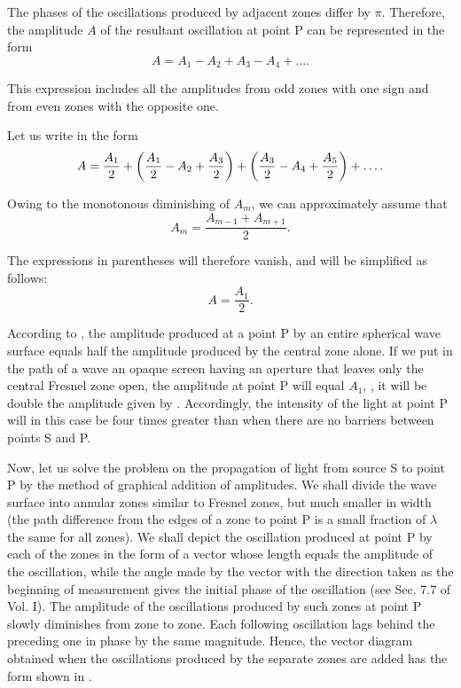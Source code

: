 The phases of the oscillations produced by adjacent zones differ by $\pi$.
Therefore, the amplitude $A$ of the resultant oscillation at point P can be represented in the form
\begin{equation}\label{eq:18_9}
    A = A_1 - A_2 + A_3 - A_4 + \ldots .
\end{equation}

This expression includes all the amplitudes from odd zones with one sign and from even zones with the opposite one.

Let us write  in the form
\begin{equation}\label{eq:18_10}
	A = \frac{A_1}{2} + \left( \frac{A_1}{2} - A_2 + \frac{A_3}{2} \right) + \left( \frac{A_3}{2} - A_4 + \frac{A_5}{2} \right) + \ldots .
\end{equation}

\noindent
Owing to the monotonous diminishing of $A_m$, we can approximately assume that
\begin{equation*}
	A_m = \frac{A_{m-1} + A_{m+1}}{2}.
\end{equation*}

\noindent
The expressions in parentheses will therefore vanish, and  will be simplified as follows:
\begin{equation}\label{eq:18_11}
	A = \frac{A_1}{2}.
\end{equation}

\noindent
According to , the amplitude produced at a point P by an entire spherical wave surface equals half the amplitude produced by the central zone alone.
If we put in the path of a wave an opaque screen having an aperture that leaves only the central Fresnel zone open, the amplitude at point P will equal $A_1$, \ie, it will be double the amplitude given by .
Accordingly, the intensity of the light at point P will in this case be four times greater than when there are no barriers between points S and P.

Now, let us solve the problem on the propagation of light from source S to point P by the method of graphical addition of amplitudes.
We shall divide the wave surface into annular zones similar to Fresnel zones, but much smaller in width (the path difference from the edges of a zone to point P is a small fraction of $\lambda$ the same for all zones).
We shall depict the oscillation produced at point P by each of the zones in the form of a vector whose length equals the amplitude of the oscillation, while the angle made by the vector with the direction taken as the beginning of measurement gives the initial phase of the oscillation (see Sec. 7.7 of Vol. I).
The amplitude of the oscillations produced by such zones at point P slowly diminishes from zone to zone.
Each following oscillation lags behind the preceding one in phase by the same magnitude.
Hence, the vector diagram obtained when the oscillations produced by the separate zones are added has the form shown in .

